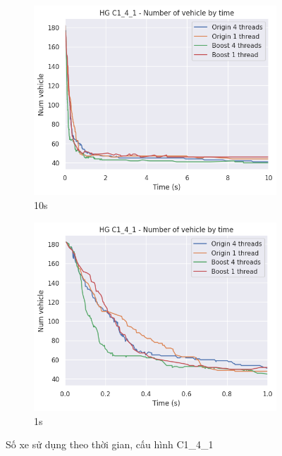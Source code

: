 \begin{figure}[H] %
  \label{fig:perf_ct_c1_4}
  \begin{subfigure}{.5\textwidth}
    \centering
    \includegraphics[width=1\linewidth]{figures/nv_time_10s_C1_4_1.png}
    \caption{10s}
    \label{fig:perf_ct_c1_4_10s}
  \end{subfigure}%
  \begin{subfigure}{.5\textwidth}
    \centering
    \includegraphics[width=1\linewidth]{figures/nv_time_1s_C1_4_1.png}
    \caption{1s}
    \label{fig:perf_ct_c1_4_1s}
  \end{subfigure}
  \caption{Số xe sử dụng theo thời gian, cấu hình C1\_4\_1}
\end{figure}

